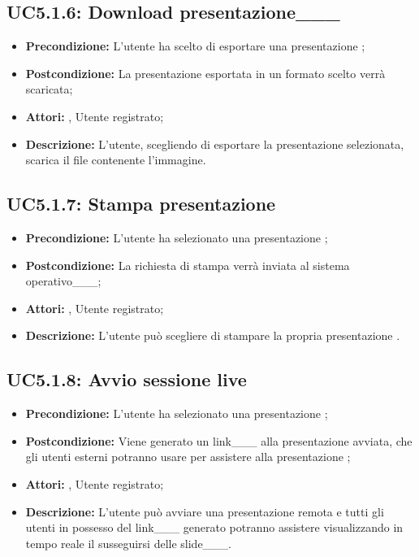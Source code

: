 \subsection{ UC5.1.6: Download presentazione___}

\begin{itemize}
	\item \textbf{Precondizione:} L'utente ha scelto di esportare una presentazione ;
	\item \textbf{Postcondizione:} La presentazione esportata in un formato scelto verrà scaricata;
	\item \textbf{Attori:} , Utente registrato;
	\item \textbf{Descrizione:} L'utente, scegliendo di esportare la presentazione selezionata, scarica il file contenente l'immagine.
\end{itemize}
\subsection{ UC5.1.7: Stampa presentazione }

\begin{itemize}
	\item \textbf{Precondizione:} L'utente ha selezionato una presentazione ;
	\item \textbf{Postcondizione:} La richiesta di stampa verrà inviata al sistema operativo___;
	\item \textbf{Attori:} , Utente registrato;
	\item \textbf{Descrizione:} L'utente può scegliere di stampare la propria presentazione .
\end{itemize}
\subsection{ UC5.1.8: Avvio sessione live}

\begin{itemize}
	\item \textbf{Precondizione:} L'utente ha selezionato una presentazione ;
	\item \textbf{Postcondizione:} Viene generato un link___ alla presentazione avviata, che gli utenti esterni potranno usare per assistere alla presentazione ;
	\item \textbf{Attori:} , Utente registrato;
	\item \textbf{Descrizione:} L'utente può avviare una presentazione remota e tutti gli utenti in possesso del link___ generato potranno assistere visualizzando in tempo reale il susseguirsi delle slide___.
\end{itemize}
